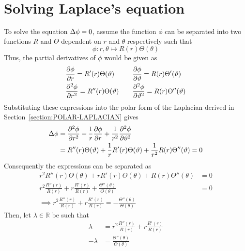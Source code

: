 \section{Solving Laplace's equation}
To solve the equation $\Delta\phi=0$, assume the function $\phi$ can be separated into two functions $R$ and $\Theta$
dependent on $r$ and $\theta$ respectively such that
$$
    \phi:r,\theta\mapsto R(r)\Theta(\theta)
$$
Thus, the partial derivatives of $\phi$ would be given as
\begin{align*}
    &\pdv{\phi}{r}=R'(r)\Theta(\vartheta)\quad&&\pdv{\phi}{\vartheta}=R(r)\Theta'(\vartheta)\\
    &\pdv[2]{\phi}{r}=R''(r)\Theta(\vartheta)\quad&&\pdv[2]{\phi}{\vartheta}=R(r)\Theta''(\vartheta)
\end{align*}
Substituting these expressions into the polar form of the Laplacian derived in Section~\ref{section:POLAR-LAPLACIAN} gives
\begin{align*}
    \Delta\phi&=\pdv[2]{\phi}{r}+\frac{1}{r}\pdv{\phi}{r}+\frac{1}{r^2}\pdv[2]{\phi}{\vartheta}\\
    &=R''(r)\Theta(\vartheta)+\frac{1}{r}R'(r)\Theta(\vartheta)+\frac{1}{r^2}R(r)\Theta''(\vartheta)=0
\end{align*}
Consequently the expressions can be separated as
\begin{align*}
    r^2R''(r)\Theta(\theta)+rR'(r)\Theta(\theta)+R(r)\Theta''(\theta)&=0\\
    r^2\frac{R''(r)}{R(r)}+r\frac{R'(r)}{R(r)}+\frac{\Theta''(\theta)}{\Theta(\theta)}&=0\\
    \implies r^2\frac{R''(r)}{R(r)}+r\frac{R'(r)}{R(r)}=-\frac{\Theta''(\theta)}{\Theta(\theta)}
\end{align*}
Then, let $\lambda\in\mathbb{R}$ be such that
\begin{align}
    \label{equation:laplace-equation:1}\lambda&=r^2\frac{R''(r)}{R(r)}+r\frac{R'(r)}{R(r)}\\
    \label{equation:laplace-equation:2}-\lambda&=\frac{\Theta''(\theta)}{\Theta(\theta)}
\end{align}

